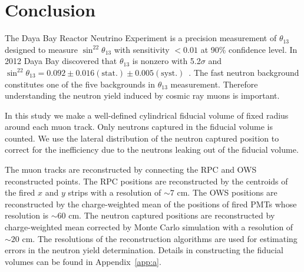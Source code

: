 \chapter{Conclusion}

The Daya Bay Reactor Neutrino Experiment is a precision measurement of $\theta_{13}$ designed to measure $\sin^22\theta_{13}$ with sensitivity $<0.01$ at 90\% confidence level. In 2012 Daya Bay discovered that $\theta_{13}$ is nonzero with 5.2$\sigma$ and $\sin^22\theta_{13}=0.092\pm0.016(\text{stat.})\pm0.005(\text{syst.})$~\cite{dayabay2012_1}. The fast neutron background constitutes one of the five backgrounds in $\theta_{13}$ measurement. Therefore understanding the neutron yield induced by cosmic ray muons is important.

In this study we make a well-defined cylindrical fiducial volume of fixed radius around each muon track. Only neutrons captured in the fiducial volume is counted. We use the lateral distribution of the neutron captured position to correct for the inefficiency due to the neutrons leaking out of the fiducial volume.

The muon tracks are reconstructed by connecting the RPC and OWS reconstructed points. The RPC positions are reconstructed by the centroids of the fired $x$ and $y$ strips with a resolution of $\sim 7$ cm. The OWS positions are reconstructed by the charge-weighted mean of the positions of fired PMTs whose resolution is $\sim 60$ cm. The neutron captured positions are reconstructed by charge-weighted mean corrected by Monte Carlo simulation with a resolution of $\sim 20$ cm. The resolutions of the reconstruction algorithms are used for estimating errors in the neutron yield determination. Details in constructing the fiducial volumes can be found in Appendix~\ref{app:a}.

